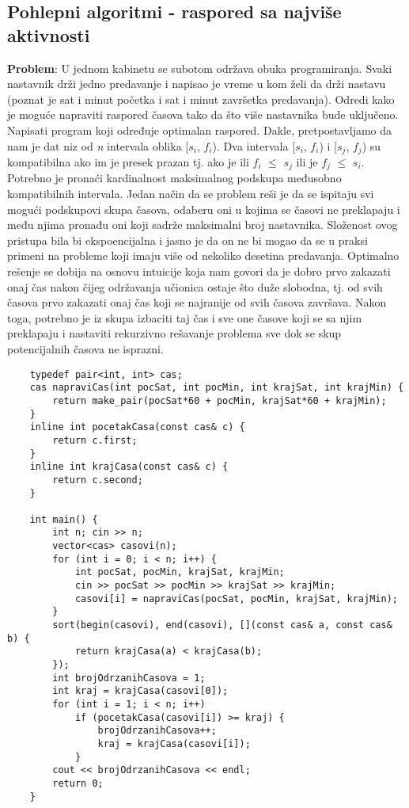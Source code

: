 \documentclass{article}
\begin{document}
\subsection{Pohlepni algoritmi - raspored sa najviše aktivnosti}
\textbf{Problem}: U jednom kabinetu se subotom održava obuka programiranja. Svaki
nastavnik drži jedno predavanje i napisao je vreme u kom želi da drži nastavu
(poznat je sat i minut početka i sat i minut završetka predavanja). Odredi kako
je moguće napraviti raspored časova tako da što više nastavnika bude uključeno.
Napisati program koji određuje optimalan raspored.
\newline
Dakle, pretpostavljamo da nam je dat niz od \textit{n} intervala oblika [$s_i$, $f_i$). Dva
intervala [$s_i$, $f_i$) i [$s_j$, $f_j$) su kompatibilna ako im je presek prazan tj. ako je ili
$f_i$ $\leq$ $s_j$ ili je $f_j$ $\leq$ $s_i$. Potrebno je pronaći kardinalnost maksimalnog podskupa
međusobno kompatibilnih intervala.
\newline
Jedan način da se problem reši je da se ispitaju svi mogući podskupovi skupa
časova, odaberu oni u kojima se časovi ne preklapaju i među njima pronađu
oni koji sadrže maksimalni broj nastavnika. Složenost ovog pristupa bila bi
ekspoencijalna i jasno je da on ne bi mogao da se u praksi primeni na probleme
koji imaju više od nekoliko desetina predavanja.
\newline
Optimalno rešenje se dobija na osnovu intuicije koja nam govori
da je dobro prvo zakazati onaj čas nakon čijeg održavanja učionica ostaje što
duže slobodna, tj. od svih časova prvo zakazati onaj čas koji se najranije od svih časova završava. Nakon toga, potrebno je iz skupa izbaciti taj čas i sve one
časove koji se sa njim preklapaju i nastaviti rekurzivno rešavanje problema sve
dok se skup potencijalnih časova ne isprazni.
\begin{lstlisting}
    typedef pair<int, int> cas;
    cas napraviCas(int pocSat, int pocMin, int krajSat, int krajMin) {
        return make_pair(pocSat*60 + pocMin, krajSat*60 + krajMin);
    }
    inline int pocetakCasa(const cas& c) {
        return c.first;
    }
    inline int krajCasa(const cas& c) {
        return c.second;
    }

    int main() {
        int n; cin >> n;
        vector<cas> casovi(n);
        for (int i = 0; i < n; i++) {
            int pocSat, pocMin, krajSat, krajMin;
            cin >> pocSat >> pocMin >> krajSat >> krajMin;
            casovi[i] = napraviCas(pocSat, pocMin, krajSat, krajMin);
        }
        sort(begin(casovi), end(casovi), [](const cas& a, const cas& b) {
            return krajCasa(a) < krajCasa(b);
        });
        int brojOdrzanihCasova = 1;
        int kraj = krajCasa(casovi[0]);
        for (int i = 1; i < n; i++)
            if (pocetakCasa(casovi[i]) >= kraj) {
                brojOdrzanihCasova++;
                kraj = krajCasa(casovi[i]);
            }
        cout << brojOdrzanihCasova << endl;
        return 0;
    }
\end{lstlisting}
\end{document}
